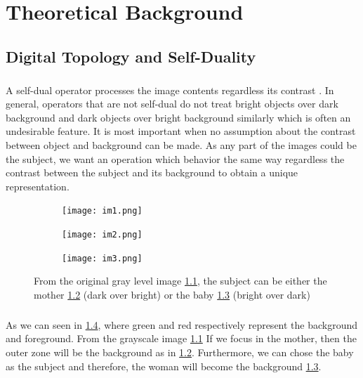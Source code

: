 \documentclass[12pt,a4paper]{report}
\author{HUYNH Le Duy}
\begin{document}
\tableofcontents

\listoffigures

\chapter{Theoretical Background}
\section{Digital Topology and Self-Duality}
\paragraph{}
A self-dual operator processes the image contents regardless its contrast \cite{Geraud.15.ismm}. In general, operators that are not self-dual do not treat bright objects over dark background and dark objects over bright background similarly which is often an undesirable feature. It is most important when no assumption about the contrast between object and background can be made. As any part of the images could be the subject, we want an operation which behavior the same way regardless the contrast between the subject and its background to obtain a unique representation.  
\begin{figure}

	\begin{subfigure}{0.3\textwidth}
	 	\texttt{[image: im1.png]} \caption{}\label{fig:gray} \end{subfigure}
	\begin{subfigure}{0.3\textwidth}
		\texttt{[image: im2.png]} \caption{}\label{fig:mother} \end{subfigure}
	\begin{subfigure}{0.3\textwidth}
		\texttt{[image: im3.png]} \caption{}\label{fig:baby} \end{subfigure}
	\centering
	\caption[Example of \textit{subjects}] {From the original gray level image \ref{fig:gray}, the subject can be either the mother \ref{fig:mother} (dark over bright) or the baby \ref{fig:baby} (bright over dark) }
	\label{fig:motheAndBaby}
\end{figure}

\paragraph{}
As we can seen in \ref{fig:motheAndBaby}, where green and red respectively represent the background and foreground. From the grayscale image \ref{fig:gray} If we focus in the mother, then the outer zone will be the background as in \ref{fig:mother}. Furthermore, we can chose the baby as the subject and therefore, the woman will become the background \ref{fig:baby}.	
\end{document}
